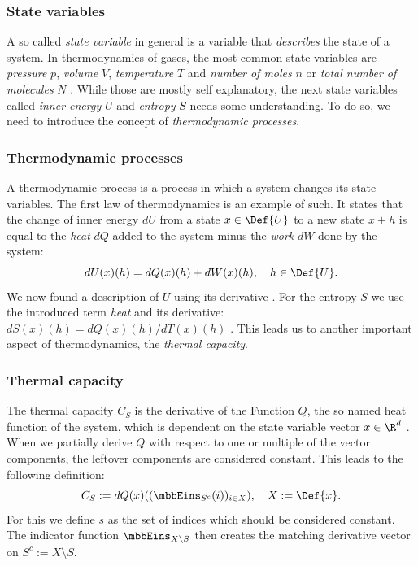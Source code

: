 \documentclass{subfiles}
\begin{document}
        \subsubsection*{State variables}
            A so called \emph{state variable} in general is a variable that \emph{describes} the state of a system. In thermodynamics of gases, the most common state variables are \emph{pressure} $p$, \emph{volume} $V$, \emph{temperature} $T$ and \emph{number of moles} $n$ or \emph{total number of molecules} $N$ \cite[p.5]{nolting42}. While those are mostly self explanatory, the next state variables called \emph{inner energy} $U$ and \emph{entropy} $S$ needs some understanding. To do so, we need to introduce the concept of \emph{thermodynamic processes}.
        \subsubsection*{Thermodynamic processes}
            A thermodynamic process is a process in which a system changes its state variables. The first law of thermodynamics is an example of such. It states that the change of inner energy $dU$ from a state $x\in\Def{U}$ to a new state $x + h$ is equal to the \emph{heat} $dQ$ added to the system minus the \emph{work} $dW$ done by the system:
            \[dU(x)(h) = dQ(x)(h) + dW(x)(h),\quad h\in\Def{U}.\]
            We now found a description of $U$ using its derivative \cite[p.36]{nolting42}. For the entropy $S$ we use the introduced term \emph{heat} and its derivative: $dS(x)(h) = dQ(x)(h) / dT(x)(h)$ \cite[p.56]{nolting42}. This leads us to another important aspect of thermodynamics, the \emph{thermal capacity}.

        \subsubsection*{Thermal capacity}
            The thermal capacity $C_S$ is the derivative of the Function $Q$, the so named heat function of the system, which is dependent on the state variable vector $x\in\R^d$ \cite[p.37-38]{nolting42}. When we partially derive $Q$ with respect to one or multiple of the vector components, the leftover components are considered constant. This leads to the following definition:
            \[C_S:=dQ(x)((\mbbEins_{S^c}(i))_{i\in X}),\quad X:=\Def{x}.\]
            For this we define $s$ as the set of indices which should be considered constant. The indicator function $\mbbEins_{X\setminus S}$ then creates the matching derivative vector on $S^c:=X\setminus S$. 
\end{document}
